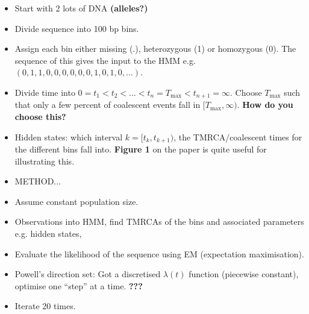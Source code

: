 \documentclass[12pt]{article}
\begin{document}
\begin{itemize}
\item Start with 2 lots of DNA \textbf{(alleles?)}
\item Divide sequence into 100 bp bins.
\item Assign each bin either missing (.), heterozygous (1) or homozygous (0). The sequence of this gives the input to the HMM e.g. $(0,1,1,0,0,0,0,0,0,1,0,1,0,\dots)$.
\item Divide time into $0=t_1<t_2<\dots<t_n=T_{\text{max}}<t_{n+1}=\infty$. Choose $T_{\text{max}}$ such that only a few percent of coalescent events fall in $[T_{\text{max}},\infty)$. \textbf{How do you choose this?}
\item Hidden states: which interval $k=[t_k,t_{k+1})$, the TMRCA/coalescent times for the different bins fall into. \textbf{Figure 1} on the paper is quite useful for illustrating this.
\item METHOD...
\item Assume constant population size.
\item Observations into HMM, find TMRCAs of the bins and associated parameters e.g. hidden states, 
\item Evaluate the likelihood of the sequence using EM (expectation maximisation).
\item Powell's direction set: Got a discretised $\lambda(t)$ function (piecewise constant), optimise one ``step''  at a time. \textbf{???}
\item Iterate 20 times.
\end{itemize}
\end{document}
